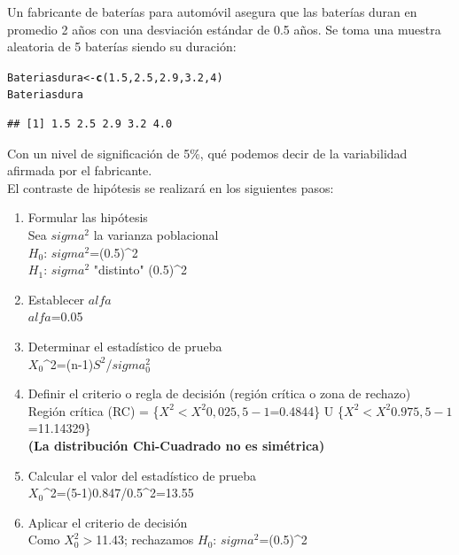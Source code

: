 \documentclass[12pt,letterpaper]{article}\usepackage[]{graphicx}\usepackage[]{color}
\makeatletter
\newcommand{\hlnum}[1]{\textcolor[rgb]{0.686,0.059,0.569}{#1}}%
\newcommand{\hlstd}[1]{\textcolor[rgb]{0.345,0.345,0.345}{#1}}%
\newcommand{\hlkwb}[1]{\textcolor[rgb]{0.69,0.353,0.396}{#1}}%
\newcommand{\hlkwd}[1]{\textcolor[rgb]{0.737,0.353,0.396}{\textbf{#1}}}%
\newenvironment{kframe}{%
 \def\at@end@of@kframe{}%
 \ifinner\ifhmode%
  \def\at@end@of@kframe{\end{minipage}}%
  \begin{minipage}{\columnwidth}%
 \fi\fi%
 \def\FrameCommand##1{\hskip\@totalleftmargin \hskip-\fboxsep
 \colorbox{shadecolor}{##1}\hskip-\fboxsep
     \hskip-\linewidth \hskip-\@totalleftmargin \hskip\columnwidth}%
 \MakeFramed {\advance\hsize-\width
   \@totalleftmargin\z@ \linewidth\hsize
   \@setminipage}}%
 {\par\unskip\endMakeFramed%
 \at@end@of@kframe}
\newenvironment{knitrout}{}{} %
\makeatother
\begin{document}
Un fabricante de bater\'ias para autom\'ovil asegura que las bater\'ias duran en promedio 2 a\~nos con una desviaci\'on est\'andar de 0.5 a\~nos. Se toma una muestra aleatoria de 5 bater\'ias siendo su duraci\'on: 
\begin{knitrout}
\color{fgcolor}\begin{kframe}
\begin{alltt}
\hlstd{Bateriasdura} \hlkwb{<-} \hlkwd{c}\hlstd{(}\hlnum{1.5}\hlstd{,} \hlnum{2.5}\hlstd{,} \hlnum{2.9}\hlstd{,} \hlnum{3.2}\hlstd{,} \hlnum{4}\hlstd{)}
\hlstd{Bateriasdura}
\end{alltt}
\begin{verbatim}
## [1] 1.5 2.5 2.9 3.2 4.0
\end{verbatim}
\end{kframe}
\end{knitrout}

Con un nivel de significaci\'on de 5\%, qu\'e podemos decir de la variabilidad afirmada por el fabricante.\\

El contraste de hip\'otesis se realizar\'a en los siguientes pasos:
\begin{enumerate}
   \item Formular las hip\'otesis\\
     Sea $sigma^2$ la varianza poblacional\\
     $H_0$: $sigma^2$=(0.5)^2\\
     $H_1$: $sigma^2$ "distinto" (0.5)^2
     
   \item Establecer $alfa$ \\
   $alfa$=0.05
   
   \item Determinar el estad\'istico de prueba\\
   $X_0$^2=(n-1)$S^2$/$sigma^2_0$
   
   \item Definir el criterio o regla de decisi\'on (regi\'on cr\'itica o zona de rechazo)\\ 
Regi\'on cr\'itica (RC) = \{$X^2$$<$$X^2_\ 0,025,5-1$=0.4844\} U \{$X^2$$<$$X^2_\ 0.975,5-1$=11.14329\}\\

\textbf{(La distribuci\'on Chi-Cuadrado no es sim\'etrica)}

\item Calcular el valor del estad\'istico de prueba\\
$X_0$^2=(5-1)0.847/0.5^2=13.55

\item Aplicar el criterio de decisi\'on\\
Como $X^2_0$$>$11.43; rechazamos $H_0$: $sigma^2$=(0.5)^2

\end{enumerate}
\end{document}
